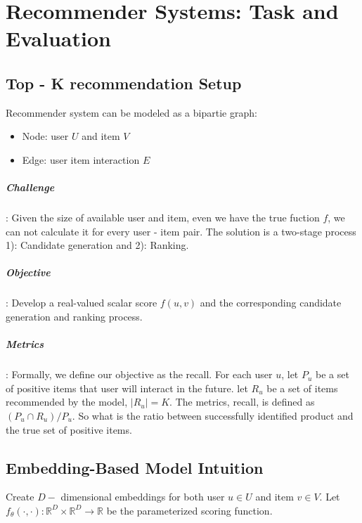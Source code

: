 \chapter{Recommender Systems: Task and Evaluation} 

\section{Top - K recommendation Setup}
Recommender system can be modeled as a bipartie graph: 
    \begin{itemize}
        \item Node: user $U$ and item $V$
        \item Edge: user item interaction $E$
    \end{itemize}

\paragraph{Challenge}: Given the size of available user and item, even we have the true fuction $f$, we can not calculate it for every user - item pair. The solution is a two-stage process 1): Candidate generation and 2): Ranking.

\paragraph{Objective}: Develop a real-valued scalar score $f(u,v)$ and the corresponding candidate generation and ranking process. 

\paragraph{Metrics}: Formally, we define our objective as the recall. For each user $u$, let $P_u$ be a set of positive items that user will interact in the future. let $R_u$ be a set of items recommended by the model, $|R_u|=K$. The metrics, recall, is defined as $(P_u \cap R_u) / P_u $. So what is the ratio between successfully identified product and the true set of positive items. 

\section{Embedding-Based Model Intuition}
Create $D-$ dimensional embeddings for both user $u\in U$ and item $v\in V$. Let $f_\theta(\cdot, \cdot):\mathbb{R}^D \times \mathbb{R}^D \to \mathbb{R}$ be the parameterized scoring function. 

